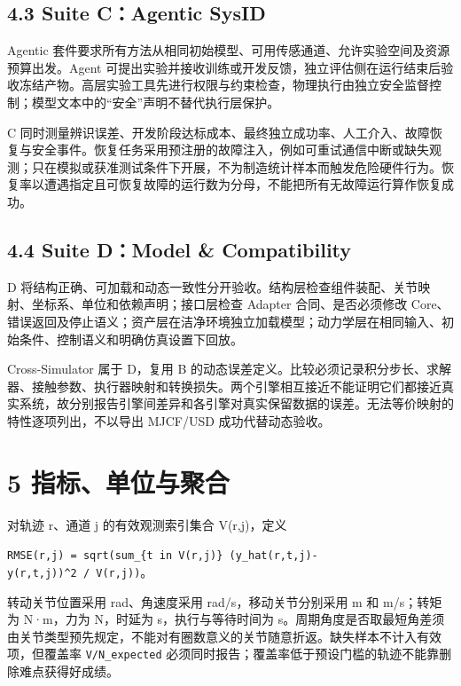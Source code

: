 \documentclass[
  chinese,
  11pt,
  a4paper,
  fontset=fandol]{ctexart}
\begin{document}
\subsection{4.3 Suite C：Agentic SysID}\label{suite-cagentic-sysid}

Agentic
套件要求所有方法从相同初始模型、可用传感通道、允许实验空间及资源预算出发。Agent
可提出实验并接收训练或开发反馈，独立评估侧在运行结束后验收冻结产物。高层实验工具先进行权限与约束检查，物理执行由独立安全监督控制；模型文本中的``安全''声明不替代执行层保护。

C
同时测量辨识误差、开发阶段达标成本、最终独立成功率、人工介入、故障恢复与安全事件。恢复任务采用预注册的故障注入，例如可重试通信中断或缺失观测；只在模拟或获准测试条件下开展，不为制造统计样本而触发危险硬件行为。恢复率以遭遇指定且可恢复故障的运行数为分母，不能把所有无故障运行算作恢复成功。

\subsection{4.4 Suite D：Model \&
Compatibility}\label{suite-dmodel-compatibility}

D
将结构正确、可加载和动态一致性分开验收。结构层检查组件装配、关节映射、坐标系、单位和依赖声明；接口层检查
Adapter 合同、是否必须修改
Core、错误返回及停止语义；资产层在洁净环境独立加载模型；动力学层在相同输入、初始条件、控制语义和明确仿真设置下回放。

Cross-Simulator 属于 D，复用 B
的动态误差定义。比较必须记录积分步长、求解器、接触参数、执行器映射和转换损失。两个引擎相互接近不能证明它们都接近真实系统，故分别报告引擎间差异和各引擎对真实保留数据的误差。无法等价映射的特性逐项列出，不以导出
MJCF/USD 成功代替动态验收。

\section{5
指标、单位与聚合}\label{ux6307ux6807ux5355ux4f4dux4e0eux805aux5408}

对轨迹 r、通道 j 的有效观测索引集合 V(r,j)，定义

\texttt{RMSE(r,j)\ =\ sqrt(sum\_\{t\ in\ V(r,j)\}\ (y\_hat(r,t,j)-y(r,t,j))\^{}2\ /\ \textbar{}V(r,j)\textbar{})}。

转动关节位置采用 rad、角速度采用 rad/s，移动关节分别采用 m 和
m/s；转矩为 N·m，力为 N，时延为 s，执行与等待时间为
s。周期角度是否取最短角差须由关节类型预先规定，不能对有圈数意义的关节随意折返。缺失样本不计入有效项，但覆盖率
\texttt{\textbar{}V\textbar{}/N\_expected}
必须同时报告；覆盖率低于预设门槛的轨迹不能靠删除难点获得好成绩。
\end{document}
